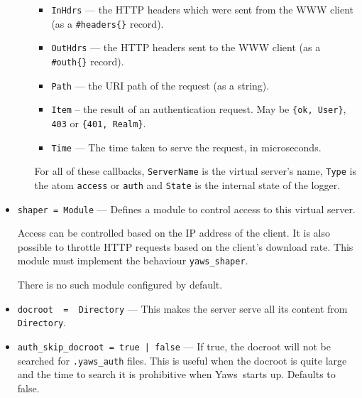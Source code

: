 \documentclass[11pt,oneside,english]{book}
\newcommand{\Yaws}            %
        {{\sc Yaws}}
\begin{document}
\begin{itemize}
\begin{itemize}
\begin{itemize}
                        \item \verb+InHdrs+ --- the HTTP headers which
                          were sent from the WWW client (as a
                          \verb+#headers{}+ record).

                        \item \verb+OutHdrs+ --- the HTTP headers sent
                          to the WWW client (as a \verb+#outh{}+
                          record).

                        \item \verb+Path+ --- the URI path of the
                          request (as a string).

                        \item \verb+Item+ -- the result of an
                          authentication request. May be
                          \verb+{ok, User}+, \verb+403+ or
                          \verb+{401, Realm}+.

                        \item \verb+Time+ --- The time taken to serve
                          the request, in microseconds.

                        \end{itemize}

              For all of these callbacks, \verb+ServerName+ is the virtual
              server's name, \verb+Type+ is the atom \verb+access+ or
              \verb+auth+ and \verb+State+ is the internal state of the logger.

              \end{itemize}

\item       \verb+shaper = Module+ ---
              Defines a module to control access to this virtual server.

              Access can be controlled based on the IP address of the client. It
              is also possible to throttle HTTP requests based on the client's
              download rate. This module must implement the behaviour
              \verb+yaws_shaper+.

              There is no such module configured by default.

\item       \verb+docroot  =  Directory+ ---
              This makes the server serve all its content from
              \verb+Directory+.

\item       \verb+auth_skip_docroot = true | false+ ---
              If true, the docroot will not be searched for
              \verb+.yaws_auth+ files. This is useful when the
              docroot is quite large and the time to search it is
              prohibitive when \Yaws\  starts up. Defaults to false.


\end{itemize}
\end{document}
